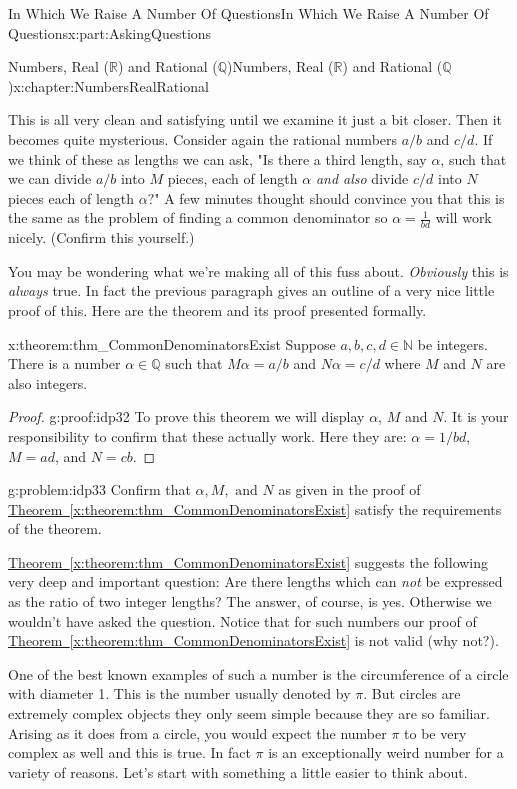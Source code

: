 \documentclass[oneside,10pt,]{book}
\newcommand{\xreffont}{\relax}
\numberwithin{equation}{section}
\newcommand{\RR}{\mathbb {R}}
\newcommand{\QQ}{\mathbb {Q}}
\newcommand{\NN}{\mathbb {N}}
\begin{document}
\begin{partptx}{In Which We Raise A Number Of Questions}{}{In Which We Raise A Number Of Questions}{}{}{x:part:AskingQuestions}
\begin{chapterptx}{Numbers, Real (\(\RR\)) and Rational (\(\QQ\))}{}{Numbers, Real (\(\RR\)) and Rational (\(\QQ\))}{}{}{x:chapter:NumbersRealRational}
\begin{introduction}{}
This is all very clean and satisfying until we examine it just a bit closer. Then it becomes quite mysterious. Consider again the rational numbers \(a/b\) and \(c/d\). If we think of these as lengths we can ask, "Is there a third length, say \(\alpha\), such that we can divide \(a/b\) into \(M\) pieces, each of length \(\alpha\) \emph{and also} divide \(c/d\) into \(N\) pieces each of length \(\alpha?\)" A few minutes thought should convince you that this is the same as the problem of finding a common denominator so \(\alpha=\frac{1}{bd}\) will work nicely. (Confirm this yourself.)%
\par
You may be wondering what we're making all of this fuss about. \emph{Obviously} this is \emph{always} true. In fact the previous paragraph gives an outline of a very nice little proof of this. Here are the theorem and its proof presented formally.%
\begin{theorem}{}{}{x:theorem:thm_CommonDenominatorsExist}%
 Suppose \(a, b, c, d \in\NN\) be integers. There is a number \(\alpha\in\QQ\) such that \(M\alpha=a/b\) and \(N\alpha=c/d\) where \(M\) and \(N\) are also integers.%
\end{theorem}
\begin{proof}{}{g:proof:idp32}
To prove this theorem we will display \(\alpha\), \(M\) and \(N\). It is your responsibility to confirm that these actually work. Here they are: \(\alpha=1/bd\), \(M=ad\), and \(N=cb\).%
\end{proof}
\begin{problem}{}{g:problem:idp33}%
 Confirm that \(\alpha, M, \text{ and } N\) as given in the proof of \hyperref[x:theorem:thm_CommonDenominatorsExist]{Theorem~{\xreffont\ref{x:theorem:thm_CommonDenominatorsExist}}} satisfy the requirements of the theorem.%
\end{problem}
\hyperref[x:theorem:thm_CommonDenominatorsExist]{Theorem~{\xreffont\ref{x:theorem:thm_CommonDenominatorsExist}}} suggests the following very deep and important question: Are there lengths which can \emph{not} be expressed as the ratio of two integer lengths? The answer, of course, is yes. Otherwise we wouldn't have asked the question. Notice that for such numbers our proof of \hyperref[x:theorem:thm_CommonDenominatorsExist]{Theorem~{\xreffont\ref{x:theorem:thm_CommonDenominatorsExist}}} is not valid (why not?).%
\par
One of the best known examples of such a number is the circumference of a circle with diameter 1. This is the number usually denoted by \(\pi\). But circles are extremely complex objects \textemdash{} they only seem simple because they are so familiar. Arising as it does from a circle, you would expect the number \(\pi\) to be very complex as well and this is true. In fact \(\pi\) is an exceptionally weird number for a variety of reasons. Let's start with something a little easier to think about.%

\end{introduction}
\end{chapterptx}
\end{partptx}
\end{document}
